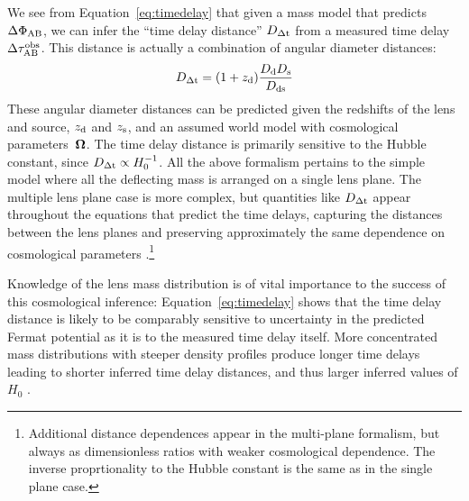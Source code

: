 
We see from Equation~\ref{eq:timedelay} that given a mass
model that predicts $\Delta \Phi_{\rm AB}$, we can infer the ``time
delay distance'' $D_{\Delta{\rm t}}$ from a measured time delay $\Delta \tau_{\rm AB}^{\rm obs}$.
This distance is actually a combination of angular diameter
distances:
%
\begin{equation}
    D_{\Delta{\rm t}} = (1+z_{\rm d}) \frac{D_{\rm d} D_{\rm s}}{D_{\rm ds}}  \label{eq:ddt}
\end{equation}
%
These angular diameter distances can be predicted given the redshifts
of the lens and source, $z_{\rm d}$ and $z_{\rm s}$, and an assumed world model with
cosmological parameters~$\boldsymbol{\Omega}$. The time delay distance is primarily
sensitive to the Hubble constant, since $D_{\Delta{\rm t}} \propto H_0^{-1}$.
All the above formalism pertains to the simple model where
all the deflecting mass is arranged on a single lens plane. The multiple
lens plane case is more complex, but quantities like $D_{\Delta{\rm t}}$ appear
throughout the equations that predict the time delays, capturing the
distances between the lens planes and preserving approximately the
same dependence on cosmological parameters \citep{Petters2001,McCullyEtal2014}.\footnote{Additional
distance dependences appear in the multi-plane formalism, but always as dimensionless
ratios with weaker cosmological dependence. The inverse proprtionality
to the Hubble constant is the same as in the single plane case.}


Knowledge of the lens mass distribution is of vital importance to the
success of this cosmological inference: Equation~\ref{eq:timedelay}
shows that the time delay distance is likely to be comparably
sensitive to uncertainty in
the predicted Fermat potential as it is to the measured time delay itself.
More concentrated mass distributions with steeper density
profiles produce longer time delays leading to shorter inferred time
delay distances, and thus larger inferred values of $H_0$ \citep{Wuc02,Koc02,Suyu12}.


